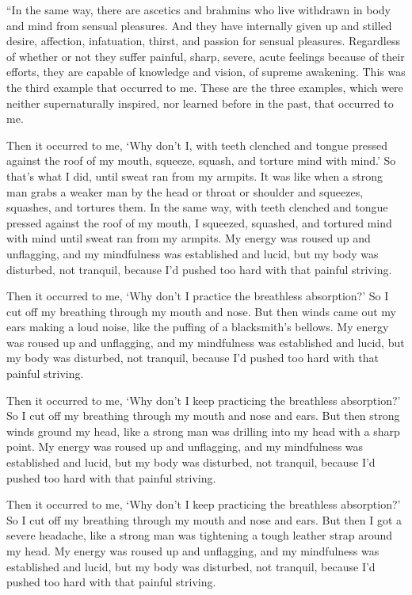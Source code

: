 \documentclass[12pt,openany]{book}%
\begin{document}
“In the same way, there are ascetics and brahmins who live withdrawn in body and mind from sensual pleasures. And they have internally given up and stilled desire, affection, infatuation, thirst, and passion for sensual pleasures. Regardless of whether or not they suffer painful, sharp, severe, acute feelings because of their efforts, they are capable of knowledge and vision, of supreme awakening. This was the third example that occurred to me. These are the three examples, which were neither supernaturally inspired, nor learned before in the past, that occurred to me. 

Then it occurred to me, ‘Why don’t I, with teeth clenched and tongue pressed against the roof of my mouth, squeeze, squash, and torture mind with mind.’ So that’s what I did, until sweat ran from my armpits. It was like when a strong man grabs a weaker man by the head or throat or shoulder and squeezes, squashes, and tortures them. In the same way, with teeth clenched and tongue pressed against the roof of my mouth, I squeezed, squashed, and tortured mind with mind until sweat ran from my armpits. My energy was roused up and unflagging, and my mindfulness was established and lucid, but my body was disturbed, not tranquil, because I’d pushed too hard with that painful striving. 

Then it occurred to me, ‘Why don’t I practice the breathless absorption?’ So I cut off my breathing through my mouth and nose. But then winds came out my ears making a loud noise, like the puffing of a blacksmith’s bellows. My energy was roused up and unflagging, and my mindfulness was established and lucid, but my body was disturbed, not tranquil, because I’d pushed too hard with that painful striving. 

Then it occurred to me, ‘Why don’t I keep practicing the breathless absorption?’ So I cut off my breathing through my mouth and nose and ears. But then strong winds ground my head, like a strong man was drilling into my head with a sharp point. My energy was roused up and unflagging, and my mindfulness was established and lucid, but my body was disturbed, not tranquil, because I’d pushed too hard with that painful striving. 

Then it occurred to me, ‘Why don’t I keep practicing the breathless absorption?’ So I cut off my breathing through my mouth and nose and ears. But then I got a severe headache, like a strong man was tightening a tough leather strap around my head. My energy was roused up and unflagging, and my mindfulness was established and lucid, but my body was disturbed, not tranquil, because I’d pushed too hard with that painful striving. 
\end{document}
